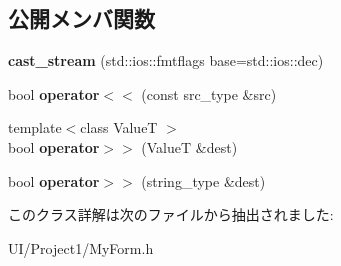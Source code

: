 \subsection*{公開メンバ関数}
\begin{DoxyCompactItemize}
\item 
\mbox{\label{class_project1_1_1_my_form_1_1clx_1_1cast__stream_a387f08a56ab764c21704f1ee8c21ae86}} 
{\bfseries cast\+\_\+stream} (std\+::ios\+::fmtflags base=std\+::ios\+::dec)
\item 
\mbox{\label{class_project1_1_1_my_form_1_1clx_1_1cast__stream_a0c73a6a819948c22efb053af7a7cf54d}} 
bool {\bfseries operator$<$$<$} (const src\+\_\+type \&src)
\item 
\mbox{\label{class_project1_1_1_my_form_1_1clx_1_1cast__stream_af016c1601747a5a98aaf73cab36e40e5}} 
{\footnotesize template$<$class ValueT $>$ }\\bool {\bfseries operator$>$$>$} (ValueT \&dest)
\item 
\mbox{\label{class_project1_1_1_my_form_1_1clx_1_1cast__stream_aaeaf3ceeb2ad1c037fc5f2a8c24f23d3}} 
bool {\bfseries operator$>$$>$} (string\+\_\+type \&dest)
\end{DoxyCompactItemize}


このクラス詳解は次のファイルから抽出されました\+:\begin{DoxyCompactItemize}
\item 
U\+I/\+Project1/My\+Form.\+h\end{DoxyCompactItemize}
